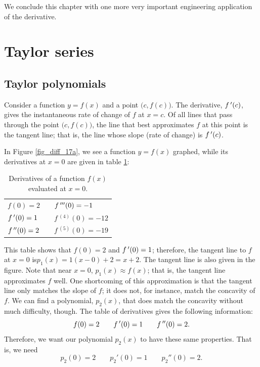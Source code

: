 \ifcourse
\ifcalculus
We conclude this chapter with one more very important engineering application of the derivative. 

\section{Taylor series}
\subsection{Taylor polynomials}
\label{sec:taylor_poly}
Consider a function $y=f(x)$ and a point $\big(c,f(c)\big)$. The derivative, $f\,'(c)$, gives the instantaneous rate of change of $f$ at $x=c$. Of all lines that pass through the point $\big(c,f(c)\big)$, the line that best approximates $f$ at this point is the tangent line; that is, the line whose slope (rate of change) is $f\,'(c)$.

In Figure \ref{fig_diff_17a}, we see a function $y=f(x)$ graphed, while its derivatives at $x=0$ are given in table \ref{tab_series_0}:
\begin{table}[H]
\caption{Derivatives of a function $f(x)$ evaluated at $x=0$.}
\label{tab_series_0}
\begin{tabular}{|lll|}\hline
$f(0) = 2$ & &$f\,'''(0) = -1$\\%
$f\,'(0) = 1$ &&	$f\,^{(4)}(0)=-12$ \\%
$f\,''(0) = 2$ && $f\,^{(5)}(0)=-19$\\\hline
\end{tabular}
\end{table}

 This table shows that $f(0)=2$ and $f\,'(0) = 1$; therefore, the tangent line to $f$ at $x=0$ is\linebreak $p_1(x) = 1(x-0)+2 = x+2$. The tangent line is also given in the figure. Note that near $x=0$, $p_1(x) \approx f(x)$; that is, the tangent line approximates $f$ well. One shortcoming of this approximation is that the tangent line only matches the slope of $f$; it does not, for instance, match the concavity of $f$. We can find a polynomial, $p_2(x)$, that does match the concavity without much difficulty, though. The table of derivatives gives the following information:
$$f(0) = 2 \qquad f\,'(0) = 1\qquad f\,''(0) = 2.$$
Therefore, we want our polynomial $p_2(x)$ to have these same properties. That is, we need $$p_2(0) = 2 \qquad p_2'(0) = 1 \qquad p_2''(0) = 2.$$

